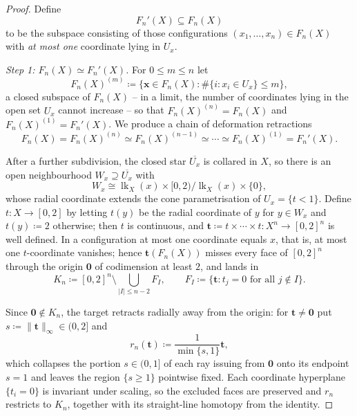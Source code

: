 \documentclass[reqno]{amsart}
\theoremstyle{definition}
\newcommand\bfx{\mathbf{x}}
\newcommand\bft{\mathbf{t}}
\DeclareMathOperator{\lk}{lk}
\numberwithin{equation}{section}
\begin{document}
\begin{proof}
Define
\[
F_n'(X) \subseteq F_n(X)
\]
to be the subspace consisting of those configurations
\((x_1,\dots,x_n)\in F_n(X)\) with \emph{at most one} coordinate
lying in \(U_x\).

\smallskip
\noindent\emph{Step 1: \(F_n(X)\simeq F_n'(X)\).}
For \(0\le m\le n\) let
\[
F_n(X)^{(m)}\coloneqq
\bigl\{\bfx\in F_n(X) : \#\{i : x_i\in U_x\}\le m\bigr\},
\]
a closed subspace of \(F_n(X)\) -- in a limit, the number of
coordinates lying in the open set \(U_x\) cannot increase -- so
that \(F_n(X)^{(n)}=F_n(X)\) and \(F_n(X)^{(1)}=F_n'(X)\). We
produce a chain of deformation retractions
\[
F_n(X)=F_n(X)^{(n)}\simeq F_n(X)^{(n-1)}\simeq\cdots
\simeq F_n(X)^{(1)}=F_n'(X).
\]

After a further subdivision, the closed star \(\overline{U_x}\)
is collared in \(X\), so there is an open neighbourhood
\(W_x\supseteq\overline{U_x}\) with
\[
W_x\cong\lk_X(x)\times[0,2)\big/\lk_X(x)\times\{0\},
\]
whose radial coordinate extends the cone parametrisation of
\(U_x=\{t<1\}\). Define \(t\colon X\to[0,2]\) by letting
\(t(y)\) be the radial coordinate of \(y\) for \(y\in W_x\) and
\(t(y)\coloneqq2\) otherwise; then \(t\) is continuous, and
\(\bft\coloneqq t\times\cdots\times t\colon X^n\to[0,2]^n\) is
well defined. In a configuration at most one coordinate equals
\(x\), that is, at most one \(t\)-coordinate vanishes; hence
\(\bft(F_n(X))\) misses every face of \([0,2]^n\) through the
origin \(\mathbf0\) of codimension at least \(2\), and lands in
\[
K_n\coloneqq[0,2]^n\setminus
\bigcup_{|I|\le n-2}F_I,
\qquad
F_I\coloneqq\bigl\{\bft : t_j=0\text{ for all }j\notin
I\bigr\}.
\]

Since \(\mathbf0\notin K_n\), the target retracts radially away
from the origin: for \(\bft\neq\mathbf0\) put
\(s\coloneqq\|\bft\|_\infty\in(0,2]\) and
\[
r_n(\bft)\coloneqq\frac{1}{\min\{s,1\}}\bft,
\]
which collapses the portion \(s\in(0,1]\) of each ray issuing
from \(\mathbf0\) onto its endpoint \(s=1\) and leaves the
region \(\{s\ge1\}\) pointwise fixed. Each coordinate hyperplane
\(\{t_i=0\}\) is invariant under scaling, so the excluded faces
are preserved and \(r_n\) restricts to \(K_n\), together with
its straight-line homotopy from the identity.


\end{proof}
\end{document}
